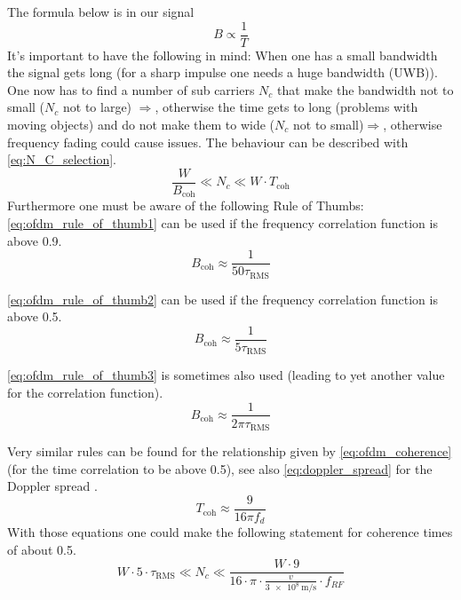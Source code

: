 The formula below is in our signal
\begin{equation}
B \propto \frac{1}{T}
\end{equation}
It's important to have the following in mind: When one has a small bandwidth the signal gets long (for a sharp impulse one needs a huge bandwidth (UWB)). One now has to find a number of sub carriers $N_c$ that make the bandwidth not to small ($N_c$ not to large) $\Rightarrow$, otherwise the time gets to long (problems with moving objects) and do not make them to wide ($N_c$ not to small)$\Rightarrow$, otherwise frequency fading could cause issues. The behaviour can be described with \autoref{eq:N_C_selection}.
\begin{equation}\label{eq:N_C_selection}
\frac{W}{B_{\mathrm{coh}}} \ll N_c \ll W \cdot T_{\mathrm{coh}}
\end{equation}
Furthermore one must be aware of the following Rule of Thumbs: \autoref{eq:ofdm_rule_of_thumb1} can be used if the frequency correlation function is above 0.9.
\begin{equation}\label{eq:ofdm_rule_of_thumb1}
B_{\mathrm{coh}} \approx \frac{1}{50 \tau_{\mathrm{RMS}}}
\end{equation}

\autoref{eq:ofdm_rule_of_thumb2} can be used if the frequency correlation function is above 0.5.
\begin{equation}\label{eq:ofdm_rule_of_thumb2}
B_{\mathrm{coh}} \approx \frac{1}{5 \tau_{\mathrm{RMS}}}
\end{equation}

\autoref{eq:ofdm_rule_of_thumb3} is sometimes also used (leading to yet another value for the correlation function).
\begin{equation}\label{eq:ofdm_rule_of_thumb3}
B_{\mathrm{coh}} \approx \frac{1}{2 \pi \tau_{\mathrm{RMS}}}
\end{equation}

Very similar rules can be found for the relationship given by \autoref{eq:ofdm_coherence}(for the time correlation to be above 0.5), see also \autoref{eq:doppler_spread} for the Doppler spread . 
\begin{equation}\label{eq:ofdm_rule_of_thumb4}
T_{\mathrm{coh}} \approx \frac{9}{16 \pi f_d}
\end{equation}
With those equations one could make the following statement for coherence times of about 0.5.
$$
W \cdot 5\cdot \tau_{\mathrm{RMS}}  \ll N_c \ll \frac{W \cdot 9}{16 \cdot \pi \cdot \frac{v}{\SI{3e8}{\meter\per\second}}\cdot f_{RF}}
$$
